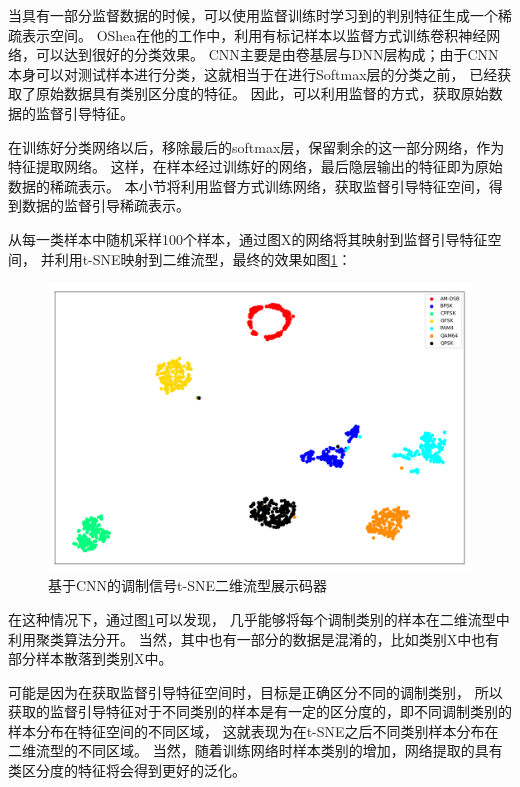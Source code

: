 当具有一部分监督数据的时候，可以使用监督训练时学习到的判别特征生成一个稀疏表示空间。
OShea在他的工作中，利用有标记样本以监督方式训练卷积神经网络，可以达到很好的分类效果。
CNN主要是由卷基层与DNN层构成；由于CNN本身可以对测试样本进行分类，这就相当于在进行Softmax层的分类之前，
已经获取了原始数据具有类别区分度的特征。
因此，可以利用监督的方式，获取原始数据的监督引导特征。\par

在训练好分类网络以后，移除最后的softmax层，保留剩余的这一部分网络，作为特征提取网络。
这样，在样本经过训练好的网络，最后隐层输出的特征即为原始数据的稀疏表示。
本小节将利用监督方式训练网络，获取监督引导特征空间，得到数据的监督引导稀疏表示。\par
从每一类样本中随机采样100个样本，通过图X的网络将其映射到监督引导特征空间，
并利用t-SNE映射到二维流型，最终的效果如图\ref{sec:fig_3_7}：
\begin{figure}[!h]
	\centering
	\includegraphics[scale=0.4]{figures/chapter_3/fig_3_7}
	\caption{基于CNN的调制信号t-SNE二维流型展示码器}	\label{sec:fig_3_7}
\end{figure}

在这种情况下，通过图\ref{sec:fig_3_7}可以发现，
几乎能够将每个调制类别的样本在二维流型中利用聚类算法分开。
当然，其中也有一部分的数据是混淆的，比如类别X中也有部分样本散落到类别X中。\par
可能是因为在获取监督引导特征空间时，目标是正确区分不同的调制类别，
所以获取的监督引导特征对于不同类别的样本是有一定的区分度的，即不同调制类别的样本分布在特征空间的不同区域，
这就表现为在t-SNE之后不同类别样本分布在二维流型的不同区域。
当然，随着训练网络时样本类别的增加，网络提取的具有类区分度的特征将会得到更好的泛化。\par


